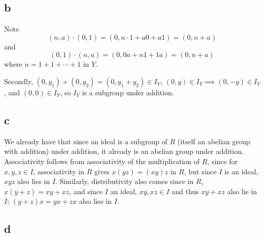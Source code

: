 \documentclass[12pt,letterpaper]{article}
\theoremstyle{definition}
\begin{document}
\subsection*{b}

Note
\[
  (n, a) \cdot (0, 1) = (0, n \cdot 1 + a0 + a1) = (0, n + a)
\]
and
\[
  (0, 1) \cdot (n, a) = (0, 0a + n1 + 1a) = (0, n + a)
\]
where $n = 1 + 1 + \cdots + 1$ in $Y$.

Secondly, $(0,y_{1}) + (0, y_{2}) = (0, y_{1} + y_{2}) \in I_{Y}$, $(0, y) \in I_{Y} \implies (0, -y) \in I_{Y}$, and $(0, 0) \in I_{Y}$, so $I_{Y}$ is a subgroup under addition.

\subsection*{c}

We already have that since an ideal is a subgroup of $R$ (itself an abelian group with addition) under addition, it already is an abelian group under addition. Associativity follows from associativity of the multiplication of $R$, since for $x, y, z \in I$, associativity in $R$ gives $x(yz) = (xy)z$ in $R$, but since $I$ is an ideal, $xyz$ also lies in $I$. Similarly, distributivity also comes since in $R$, $x(y + z) = xy + xz$, and since $I$ an ideal, $xy, xz \in I$ and thus $xy + xz$ also lie in $I$; $(y+z)x = yx + zx$ also lies in $I$.

\subsection*{d}
\end{document}
